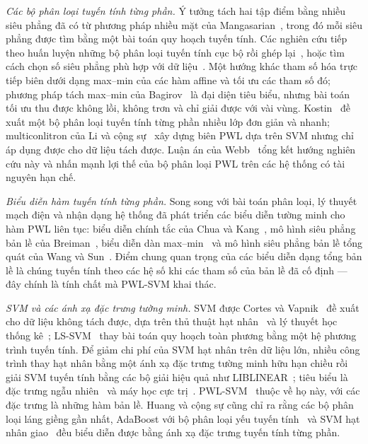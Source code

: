 \emph{Các bộ phân loại tuyến tính từng phần.} Ý tưởng tách hai tập điểm bằng nhiều siêu phẳng đã có từ phương pháp nhiều mặt của Mangasarian~\cite{mangasarian1968}, trong đó mỗi siêu phẳng được tìm bằng một bài toán quy hoạch tuyến tính. Các nghiên cứu tiếp theo huấn luyện những bộ phân loại tuyến tính cục bộ rồi ghép lại~\cite{sklansky1980}, hoặc tìm cách chọn số siêu phẳng phù hợp với dữ liệu~\cite{tenmoto1998}. Một hướng khác tham số hóa trực tiếp biên dưới dạng max--min của các hàm affine và tối ưu các tham số đó; phương pháp tách max--min của Bagirov~\cite{bagirov2005} là đại diện tiêu biểu, nhưng bài toán tối ưu thu được không lồi, không trơn và chỉ giải được với vài vùng. Kostin~\cite{kostin2006} đề xuất một bộ phân loại tuyến tính từng phần nhiều lớp đơn giản và nhanh; multiconlitron của Li và cộng sự~\cite{li2011} xây dựng biên PWL dựa trên SVM nhưng chỉ áp dụng được cho dữ liệu tách được. Luận án của Webb~\cite{webb2010} tổng kết hướng nghiên cứu này và nhấn mạnh lợi thế của bộ phân loại PWL trên các hệ thống có tài nguyên hạn chế.

\emph{Biểu diễn hàm tuyến tính từng phần.} Song song với bài toán phân loại, lý thuyết mạch điện và nhận dạng hệ thống đã phát triển các biểu diễn tường minh cho hàm PWL liên tục: biểu diễn chính tắc của Chua và Kang~\cite{chua1977}, mô hình siêu phẳng bản lề của Breiman~\cite{breiman1993}, biểu diễn dàn max--min~\cite{tarela1999,ovchinnikov2002} và mô hình siêu phẳng bản lề tổng quát của Wang và Sun~\cite{wang2005}. Điểm chung quan trọng của các biểu diễn dạng tổng bản lề là chúng tuyến tính theo các hệ số khi các tham số của bản lề đã cố định --- đây chính là tính chất mà PWL-SVM khai thác.

\emph{SVM và các ánh xạ đặc trưng tường minh.} SVM được Cortes và Vapnik~\cite{cortes1995} đề xuất cho dữ liệu không tách được, dựa trên thủ thuật hạt nhân~\cite{boser1992} và lý thuyết học thống kê~\cite{vapnik1998}; LS-SVM~\cite{suykens1999ls,suykens2002} thay bài toán quy hoạch toàn phương bằng một hệ phương trình tuyến tính. Để giảm chi phí của SVM hạt nhân trên dữ liệu lớn, nhiều công trình thay hạt nhân bằng một ánh xạ đặc trưng tường minh hữu hạn chiều rồi giải SVM tuyến tính bằng các bộ giải hiệu quả như LIBLINEAR~\cite{fan2008}; tiêu biểu là đặc trưng ngẫu nhiên~\cite{rahimi2007} và máy học cực trị~\cite{huanggb2006}. PWL-SVM~\cite{huang2013} thuộc về họ này, với các đặc trưng là những hàm bản lề. Huang và cộng sự cũng chỉ ra rằng các bộ phân loại láng giềng gần nhất, AdaBoost với bộ phân loại yếu tuyến tính~\cite{freund1995} và SVM hạt nhân giao~\cite{maji2008} đều biểu diễn được bằng ánh xạ đặc trưng tuyến tính từng phần.

